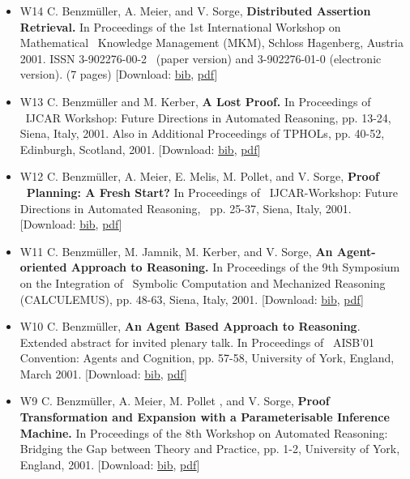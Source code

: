 \documentclass{article}
\newcommand{\tmtextbf}[1]{{\bfseries{#1}}}
\newenvironment{itemizedot}{\begin{itemize} \renewcommand{\labelitemi}{$\bullet$}\renewcommand{\labelitemii}{$\bullet$}\renewcommand{\labelitemiii}{$\bullet$}\renewcommand{\labelitemiv}{$\bullet$}}{\end{itemize}}
\begin{document}
\begin{itemizedot}
  \item [W14] {\small C. Benzm\"uller, A. Meier, and V. Sorge,
  \tmtextbf{Distributed Assertion Retrieval.} In Proceedings of the 1st
  International Workshop on Mathematical \ Knowledge Management (MKM), Schloss
  Hagenberg, Austria 2001. ISSN 3-902276-00-2 \ (paper version) and
  3-902276-01-0 (electronic version). (7 pages)} {\color{grey} [Download:
  {\small \href{../papers/W14.bib}{bib}, \href{../papers/W14.pdf}{pdf}}]}
  
  \item [W13] {\small C. Benzm\"uller and M. Kerber, \tmtextbf{A Lost Proof.}}
  {\small In Proceedings of \ IJCAR Workshop: Future Directions in Automated
  Reasoning, pp. 13-24, Siena, Italy, 2001.} {\small Also in Additional
  Proceedings of TPHOLs, pp. 40-52, Edinburgh, Scotland, 2001.} {\color{grey}
  [Download: {\small \href{../papers/W13.bib}{bib},
  \href{../papers/W13.pdf}{pdf}}]}
  
  \item [W12] {\small C. Benzm\"uller, A. Meier, E. Melis, M. Pollet, and V.
  Sorge, \tmtextbf{Proof \ Planning: A Fresh Start?}} {\small In Proceedings
  of \ IJCAR-Workshop: Future Directions in Automated Reasoning, \ pp. 25-37,
  Siena, Italy, 2001.} {\color{grey} [Download: {\small
  \href{../papers/W12.bib}{bib}, \href{../papers/W12.pdf}{pdf}}]}
  
  \item [W11] {\small C. Benzm\"uller, M. Jamnik, M. Kerber, and V. Sorge,
  \tmtextbf{An Agent-oriented Approach to Reasoning.}} {\small In Proceedings
  of the 9th Symposium on the Integration of \ Symbolic Computation and
  Mechanized Reasoning (CALCULEMUS), pp. 48-63, Siena, Italy, 2001.}
  {\color{grey} [Download: {\small \href{../papers/W11.bib}{bib},
  \href{../papers/W11.pdf}{pdf}}]}
  
  \item [W10] {\small C. Benzm\"uller, \tmtextbf{An Agent Based Approach to
  Reasoning}.} {\small Extended abstract for invited plenary talk. In
  Proceedings of \ AISB'01 Convention: Agents and Cognition, pp. 57-58,
  University of York, England, March 2001.} {\color{grey} [Download: {\small
  \href{../papers/W10.bib}{bib}, \href{../papers/W10.pdf}{pdf}}]}
  
  \item [W9] {\small C. Benzm\"uller, A. Meier, M. Pollet , and V. Sorge,}
  {\small \tmtextbf{Proof Transformation and Expansion with a Parameterisable
  Inference Machine.} In Proceedings of the 8th Workshop on Automated
  Reasoning: Bridging the Gap between Theory and Practice, pp. 1-2, University
  of York, England, 2001.} {\color{grey} [Download: {\small
  \href{../papers/W9.bib}{bib}, \href{../papers/W9.pdf}{pdf}}]}
  

\end{itemizedot}
\end{document}
